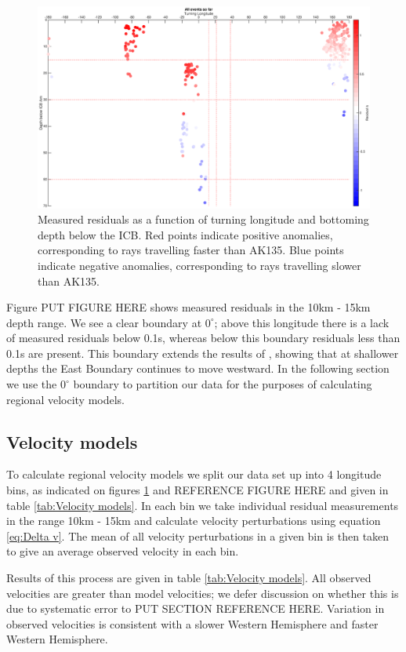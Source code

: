 \documentclass[11pt,a4paper]{article}
\begin{document}
\begin{figure}
	\centering
	\includegraphics[width=\textwidth]{figures/all_longitude}
	\caption{Measured residuals as a function of turning longitude and bottoming depth below the ICB. Red points indicate positive anomalies, corresponding to rays travelling faster than AK135. Blue points indicate negative anomalies, corresponding to rays travelling slower than AK135. }
	\label{fig:All longitude}
\end{figure}

Figure PUT FIGURE HERE shows measured residuals in the 10km - 15km depth range. We see a clear boundary at $0^{\circ}$; above this longitude there is a lack of measured residuals below 0.1s, whereas below this boundary residuals less than 0.1s are present. This boundary extends the results of \cite{Waszek2011a}, showing that at shallower depths the East Boundary continues to move westward. In the following section we use the $0^{\circ}$ boundary to partition our data for the purposes of calculating regional velocity models.

\subsection{Velocity models}
To calculate regional velocity models we split our data set up into 4 longitude bins, as indicated on figures \ref{fig:All longitude} and REFERENCE FIGURE HERE and given in table \ref{tab:Velocity models}. In each bin we take individual residual measurements in the range 10km - 15km and calculate velocity perturbations using equation \eqref{eq:Delta v}. The mean of all velocity perturbations in a given bin is then taken to give an average observed velocity in each bin.

Results of this process are given in table \ref{tab:Velocity models}. All observed velocities are greater than model velocities; we defer discussion on whether this is due to systematic error to PUT SECTION REFERENCE HERE. Variation in observed velocities is consistent with a slower Western Hemisphere and faster Western Hemisphere.
\end{document}
